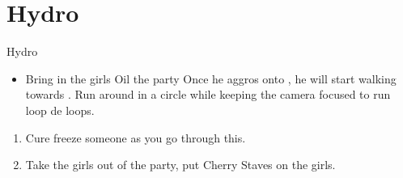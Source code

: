\chapter{Hydro}

\begin{battle}{Hydro}
\begin{itemize}
\item Bring in the girls
\penelof Oil the party
\vaanf Once he aggros onto \vaan, he will start walking towards \vaan. Run around in a circle while keeping the camera focused to run loop de loops.
\end{itemize}
\end{battle}
\begin{enumerate}
\item Cure freeze someone as you go through this.
\item Take the girls out of the party, put Cherry Staves on the girls.
\end{enumerate}